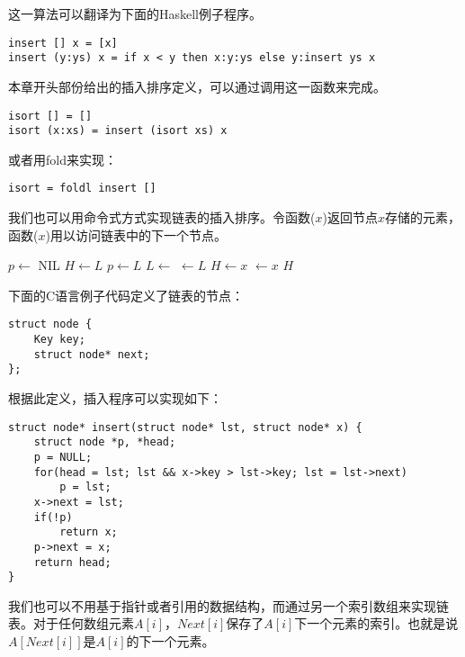 \documentclass[UTF8]{article}
\begin{document}
这一算法可以翻译为下面的Haskell例子程序。

\begin{lstlisting}[style=Haskell]
insert [] x = [x]
insert (y:ys) x = if x < y then x:y:ys else y:insert ys x
\end{lstlisting}

本章开头部份给出的插入排序定义，可以通过调用这一函数来完成。

\begin{lstlisting}[style=Haskell]
isort [] = []
isort (x:xs) = insert (isort xs) x
\end{lstlisting}

或者用fold来实现：

\begin{lstlisting}[style=Haskell]
isort = foldl insert []
\end{lstlisting}

我们也可以用命令式方式实现链表的插入排序。令函数($x$)返回节点$x$存储的元素，函数($x$)用以访问链表中的下一个节点。

\begin{algorithmic}[1]
  \State $p \gets$ NIL
  \State $H \gets L$
    \State $p \gets L$
    \State $L \gets $ 
  \EndWhile
  \State {} $\gets L$
    \State $H \gets x$
  \Else
    \State {} $\gets x$
  \EndIf
  \State \Return $H$
\EndFunction
\end{algorithmic}

下面的C语言例子代码定义了链表的节点：

\lstset{language=C}
\begin{lstlisting}
struct node {
    Key key;
    struct node* next;
};
\end{lstlisting}

根据此定义，插入程序可以实现如下：

\begin{lstlisting}
struct node* insert(struct node* lst, struct node* x) {
    struct node *p, *head;
    p = NULL;
    for(head = lst; lst && x->key > lst->key; lst = lst->next)
        p = lst;
    x->next = lst;
    if(!p)
        return x;
    p->next = x;
    return head;
}
\end{lstlisting}

我们也可以不用基于指针或者引用的数据结构，而通过另一个索引数组来实现链表。对于任何数组元素$A[i]$，$Next[i]$保存了$A[i]$下一个元素的索引。也就是说$A[Next[i]]$是$A[i]$的下一个元素。
\end{document}
